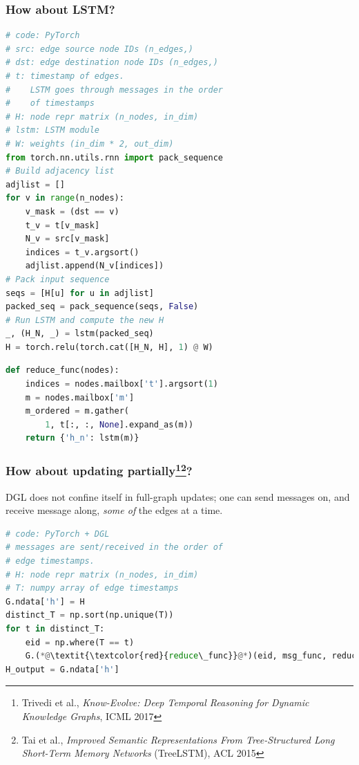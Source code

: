 \documentclass[10pt,aspectratio=169]{beamer}
\begin{document}
	\begin{frame}[fragile]
		\frametitle{How about LSTM?}
		\begin{minipage}{0.5\textwidth}
\begin{lstlisting}[language=Python]
# code: PyTorch
# src: edge source node IDs (n_edges,)
# dst: edge destination node IDs (n_edges,)
# t: timestamp of edges.
#    LSTM goes through messages in the order
#    of timestamps
# H: node repr matrix (n_nodes, in_dim)
# lstm: LSTM module
# W: weights (in_dim * 2, out_dim)
from torch.nn.utils.rnn import pack_sequence
# Build adjacency list
adjlist = []
for v in range(n_nodes):
    v_mask = (dst == v)
    t_v = t[v_mask]
    N_v = src[v_mask]
    indices = t_v.argsort()
    adjlist.append(N_v[indices])
# Pack input sequence
seqs = [H[u] for u in adjlist]
packed_seq = pack_sequence(seqs, False)
# Run LSTM and compute the new H
_, (H_N, _) = lstm(packed_seq)
H = torch.relu(torch.cat([H_N, H], 1) @ W)
\end{lstlisting}
		\end{minipage}%
		\begin{minipage}{0.5\textwidth}
\begin{lstlisting}[language=Python]
def reduce_func(nodes):
    indices = nodes.mailbox['t'].argsort(1)
    m = nodes.mailbox['m']
    m_ordered = m.gather(
        1, t[:, :, None].expand_as(m))
    return {'h_n': lstm(m)}
\end{lstlisting}
		\end{minipage}
	\end{frame}

	\begin{frame}[fragile]
		\frametitle{How about updating partially\footnote{Trivedi et al., \emph{Know-Evolve: Deep Temporal Reasoning for Dynamic Knowledge Graphs}, ICML 2017}\footnote{Tai et al., \emph{Improved Semantic Representations From Tree-Structured Long Short-Term Memory Networks}  (TreeLSTM), ACL 2015}?}
		DGL does not confine itself in full-graph updates; one can send messages on, and receive message along, \emph{some of} the edges at a time.
		\begin{center}
			\centering
			\begin{minipage}{0.5\textwidth}
\begin{lstlisting}[language=Python]
# code: PyTorch + DGL
# messages are sent/received in the order of
# edge timestamps.
# H: node repr matrix (n_nodes, in_dim)
# T: numpy array of edge timestamps
G.ndata['h'] = H
distinct_T = np.sort(np.unique(T))
for t in distinct_T:
    eid = np.where(T == t)
    G.(*@\textit{\textcolor{red}{reduce\_func}}@*)(eid, msg_func, reduce_func)
H_output = G.ndata['h']
\end{lstlisting}
			\end{minipage}
		\end{center}
	\end{frame}
\end{document}
